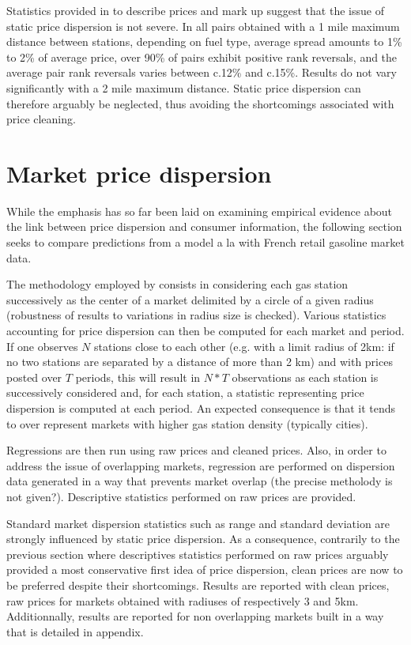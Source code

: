 \documentclass[11pt]{article}
\begin{document}
Statistics provided in \cite{TAP11} to describe prices and mark up suggest that the issue of static price dispersion is not severe. In all pairs obtained with a 1 mile maximum distance between stations, depending on fuel type, average spread amounts to 1\% to 2\% of average price, over 90\% of pairs exhibit positive rank reversals, and the average pair rank reversals varies between c.12\% and c.15\%. Results do not vary significantly with a 2 mile maximum distance. Static price dispersion can therefore arguably be neglected, thus avoiding the shortcomings associated with price cleaning.

\section{Market price dispersion}

While the emphasis has so far been laid on examining empirical evidence about the link between price dispersion and consumer information, the following section seeks to compare predictions from a model a la \cite{VAR80} with French retail gasoline market data.

The methodology employed by \cite{TAP11} consists in considering each gas station successively as the center of a market delimited by a circle of a given radius (robustness of results to variations in radius size is checked). Various statistics accounting for price dispersion can then be computed for each market and period. If one observes $N$ stations close to each other (e.g. with a limit radius of 2km: if no two stations are separated by a distance of more than 2 km) and with prices posted over $T$ periods, this will result in $N*T$ observations as each station is successively considered and, for each station, a statistic representing price dispersion is computed at each period. An expected consequence is that it tends to over represent markets with higher gas station density (typically cities).

Regressions are then run using raw prices and cleaned prices. Also, in order to address the issue of overlapping markets, regression are performed on dispersion data generated in a way that prevents market overlap (the precise metholody is not given?). Descriptive statistics performed on raw prices are provided.

Standard market dispersion statistics such as range and standard deviation are strongly influenced by static price dispersion. As a consequence, contrarily to the previous section where descriptives statistics performed on raw prices arguably provided a most conservative first idea of price dispersion, clean prices are now to be preferred despite their shortcomings. Results are reported with clean prices, raw prices for markets obtained with radiuses of respectively 3 and 5km. Additionnally, results are reported for non overlapping markets built in a way that is detailed in appendix.
\end{document}
